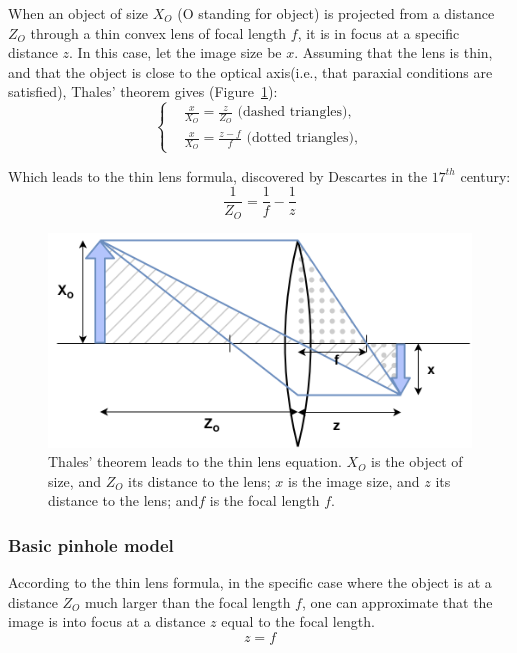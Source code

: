 When an object of size \(X_O\) (O standing for object) is projected from a distance \(Z_O\) through a thin convex lens of focal length \(f\), it is in focus at a specific distance \(z\). In this case, let the image size be \(x\). Assuming that the lens is thin, and that the object is close to the optical axis(i.e., that paraxial conditions are satisfied), Thales' theorem gives (Figure~\ref{fig_thinlens}):
\begin{equation}
  \begin{cases}
  &\frac{x}{X_O} = \frac{z}{Z_O} \text{ (dashed triangles)},\\
  &\frac{x}{X_O} = \frac{z-f}{f} \text{ (dotted triangles)},
  \end{cases}
\end{equation}

Which leads to the thin lens formula, discovered by Descartes in the $17^{th}$ century:
\begin{equation}
    \frac{1}{Z_O} = \frac{1}{f} - \frac{1}{z}
\end{equation}

\begin{figure}[hbtp]
	\centering
	\def\svgwidth{\columnwidth}
	\fontsize{10pt}{10pt}\selectfont
	\includegraphics[width=0.5\linewidth]{"../Chap2/Figures/Thin_Lens.png"}
	\caption{Thales' theorem leads to the thin lens equation. \(X_O\) is the object of size, and \(Z_O\) its distance to the lens; \(x\) is the image size, and \(z\) its distance to the lens; and\(f\) is the focal length \(f\).} 
	\label{fig_thinlens}
\end{figure}

\subsubsection{Basic pinhole model}

According to the thin lens formula, in the specific case where the object is at a distance \(Z_O\) much larger than the focal length \(f\), one can approximate that the image is into focus at a distance \(z\) equal to the focal length. 
\begin{equation}
    z=f
\end{equation}

